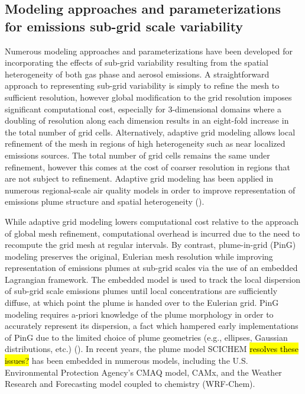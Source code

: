 \subsection{Modeling approaches and parameterizations for emissions sub-grid scale variability}

Numerous modeling approaches and parameterizations have been developed for incorporating the effects of sub-grid variability resulting from the spatial heterogeneity of both gas phase and aerosol emissions. A straightforward approach to representing sub-grid variability is simply to refine the mesh to sufficient resolution, however global modification to the grid resolution imposes significant computational cost, especially for 3-dimensional domains where a doubling of resolution along each dimension results in an eight-fold increase in the total number of grid cells. Alternatively, adaptive grid modeling allows local refinement of the mesh in regions of high heterogeneity such as near localized emissions sources. The total number of grid cells remains the same under refinement, however this comes at the cost of coarser resolution in regions that are not subject to refinement. Adaptive grid modeling has been applied in numerous regional-scale air quality models in order to improve representation of emissions plume structure and spatial heterogeneity (\cite{karamchandani_sub-grid_2011}).  

While adaptive grid modeling lowers computational cost relative to the approach of global mesh refinement, computational overhead is incurred due to the need to recompute the grid mesh at regular intervals. By contrast, plume-in-grid (PinG) modeling preserves the original, Eulerian mesh resolution while improving representation of emissions plumes at sub-grid scales via the use of an embedded Lagrangian framework. The embedded model is used to track the local dispersion of sub-grid scale emissions plumes until local concentrations are sufficiently diffuse, at which point the plume is handed over to the Eulerian grid. PinG modeling requires a-priori knowledge of the plume morphology in order to accurately represent its dispersion, a fact which hampered early implementations of PinG due to the limited choice of plume geometries (e.g., ellipses, Gaussian distributions, etc.) (\cite{karamchandani_sub-grid_2011}). In recent years, the plume model SCICHEM \hl{resolves these issues?} has been embedded in numerous models, including the U.S. Environmental Protection Agency's CMAQ model, CAMx, and the Weather Research and Forecasting model coupled to chemistry (WRF-Chem). 

